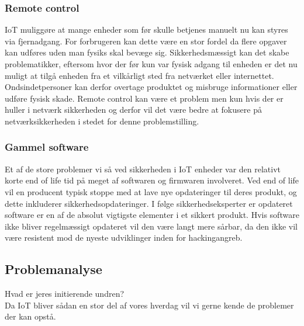         
        \subsubsection{Remote control}
        IoT muliggøre at mange enheder som før skulle betjenes manuelt nu kan styres via fjernadgang. For forbrugeren kan dette være en stor fordel da flere opgaver kan udføres uden man fysiks skal bevæge sig. Sikkerhedsmæssigt kan det skabe problematikker, eftersom hvor der før kun var fysisk adgang til enheden er det nu muligt at tilgå enheden fra et vilkårligt sted fra netværket eller internettet.\\ 
        Ondsindetpersoner kan derfor overtage produktet og misbruge informationer eller udføre fysisk skade. Remote control kan være et problem men kun hvis der er huller i netværk sikkerheden og derfor vil det være bedre at fokusere på netværksikkerheden i stedet for denne problemstilling.\autocite{Forbes2017}\\
        
        \subsubsection{Gammel software}
        Et af de store problemer vi så ved sikkerheden i IoT enheder var den relativt korte end of life tid på meget af softwaren og firmwaren involveret. Ved end of life vil en producent typisk stoppe med at lave nye opdateringer til deres produkt, og dette inkluderer sikkerhedsopdateringer. I følge sikkerhedseksperter er opdateret software er en af de absolut vigtigste elementer i et sikkert produkt. \autocite{soups2015} Hvis software ikke bliver regelmæssigt opdateret vil den være langt mere sårbar, da den ikke vil være resistent mod de nyeste udviklinger inden for hackingangreb.
        
    \subsection{Problemanalyse}
    Hvad er jeres initierende undren?\\
    Da IoT bliver sådan en stor del af vores hverdag vil vi gerne kende de problemer der kan opstå. \\
        
    
        
